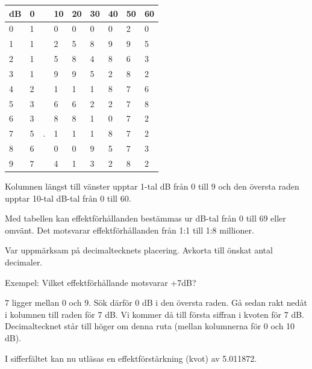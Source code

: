 \begin{rev-raderas}
\begin{tabular}{l|llllllll}
  dB & 0 & & 10 & 20 & 30 & 40 & 50 & 60 \\
  \hline
  0  & 1 & & 0  & 0  & 0  & 0  & 2  & 0 \\
  1  & 1 & & 2  & 5  & 8  & 9  & 9  & 5 \\
  2  & 1 & & 5  & 8  & 4  & 8  & 6  & 3 \\
  3  & 1 & & 9  & 9  & 5  & 2  & 8  & 2 \\
  4  & 2 & & 1  & 1  & 1  & 8  & 7  & 6 \\
  5  & 3 & & 6  & 6  & 2  & 2  & 7  & 8 \\
  6  & 3 & & 8  & 8  & 1  & 0  & 7  & 2 \\
  7  & 5 &.& 1  & 1  & 1  & 8  & 7  & 2 \\
  8  & 6 & & 0  & 0  & 9  & 5  & 7  & 3 \\
  9  & 7 & & 4  & 1  & 3  & 2  & 8  & 2 \\
\end{tabular}

Kolumnen längst till vänster upptar 1-tal dB från 0 till 9 och den
översta raden upptar 10-tal dB-tal från 0 till 60.

Med tabellen kan effektförhållanden bestämmas ur dB-tal från 0 till 69
eller omvänt.  Det motsvarar effektförhållanden från 1:1 till 1:8
millioner.

Var uppmärksam på decimaltecknets placering. Avkorta till önskat antal decimaler.

Exempel: Vilket effektförhållande motsvarar +7dB?

7 ligger mellan 0 och 9. Sök därför 0 dB i den översta raden. Gå sedan
rakt nedåt i kolumnen till raden för 7 dB. Vi kommer då till första
siffran i kvoten för 7 dB. Decimaltecknet står till höger om denna
ruta (mellan kolumnerna för 0 och 10 dB).

I sifferfältet kan nu utläsas en effektförstärkning (kvot) av
5.011872.

\end{rev-raderas}

